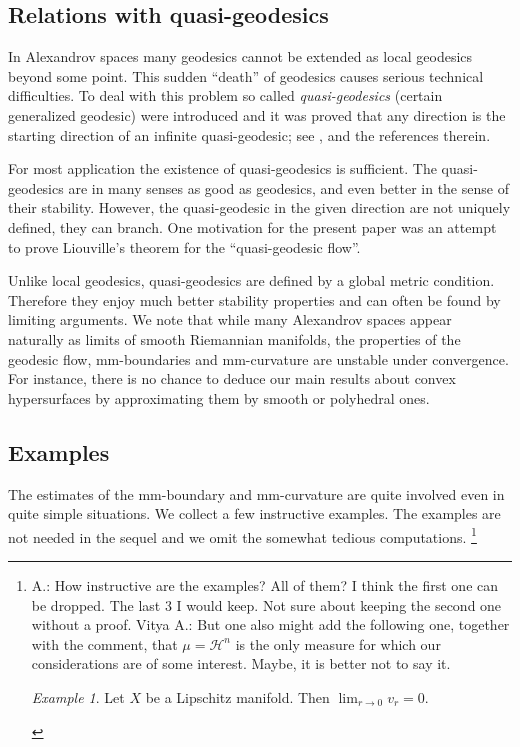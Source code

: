 \documentclass[12pt,leqno,intlimits]{amsart}
\numberwithin{equation}{section}
\theoremstyle{definition}
\theoremstyle{remark}
\newtheorem{ex}[thm]{Example}
\begin{document}
\subsection{Relations with quasi-geodesics}
In Alexandrov spaces  many geodesics cannot be extended as local geodesics beyond some point.
This sudden ``death''  of geodesics  causes  serious technical difficulties.
To deal with this problem  so called \emph{quasi-geodesics} (certain generalized geodesic)
were introduced
and it was proved
that any direction is the starting direction of an infinite quasi-geodesic;
see \cite{Petsemi}, \cite{PP} and the references therein.

For most application the existence of quasi-geodesics is sufficient.
The quasi-geodesics are in many senses as good as geodesics, and even better in the sense of their stability.
However, the quasi-geodesic in the given direction are not uniquely defined, they can branch.
One motivation for the present paper was an attempt to prove Liouville's theorem for the ``quasi-geodesic flow''.

Unlike local geodesics, quasi-geodesics are defined by a global metric condition. Therefore they enjoy much better stability properties
and can often be found by limiting arguments.
We note that while many Alexandrov spaces appear naturally  as limits of smooth Riemannian manifolds, the properties of the geodesic flow, mm-boundaries and mm-curvature are unstable under
convergence.
For instance, there is  no chance to deduce our main results about convex hypersurfaces by approximating them by smooth or polyhedral ones.



\subsection{Examples} \label{subsec:example}
The estimates of the   mm-boundary and mm-curvature are quite involved even in  quite  simple situations.
We collect a few instructive examples. %
The examples  are not  needed in the sequel and we omit the somewhat tedious computations. \footnote{A.: How instructive are the examples? All of them?{\color{red} I think the  first one can be dropped. The last 3 I would keep. Not sure about keeping the second one without a proof. Vitya}
 A.:   But one also might add the following one, together with the comment, that $\mu =\mathcal H^n$ is the only measure for which our considerations are of some interest.  Maybe, it is better not to say it.  \begin{ex}
Let $X$ be a Lipschitz manifold.
Then $\lim _{r\to 0} v_r =0$.
\end{ex}
}
\end{document}
